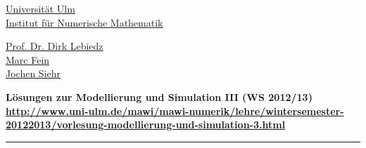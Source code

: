 
\begin{minipage}{0.49\textwidth}
 \begin{flushleft}
  \href{http://www.uni-ulm.de}{Universit\"at Ulm}\\
  \href{http://www.uni-ulm.de/mawi/mawi-numerik.html}{Institut f\"ur Numerische Mathematik}
 \end{flushleft}
\end{minipage}
\begin{minipage}{0.49\textwidth}
 \begin{flushright}
  \href{http://www.lebiedz.de}{Prof. Dr. Dirk Lebiedz}\\
  \href{http://www.lebiedz.de/gruppe/marcfein/index.html}{Marc Fein}\\
  \href{http://www.siehr.net}{Jochen Siehr}
 \end{flushright}
\end{minipage}
\bigskip
\begin{center}
\textbf{
L\"osungen \theblatt{} 
zur Modellierung und Simulation III
(WS 2012/13)\\
\url{http://www.uni-ulm.de/mawi/mawi-numerik/lehre/wintersemester-20122013/vorlesung-modellierung-und-simulation-3.html}
}
\end{center}
\bigskip
\hrule
\bigskip

